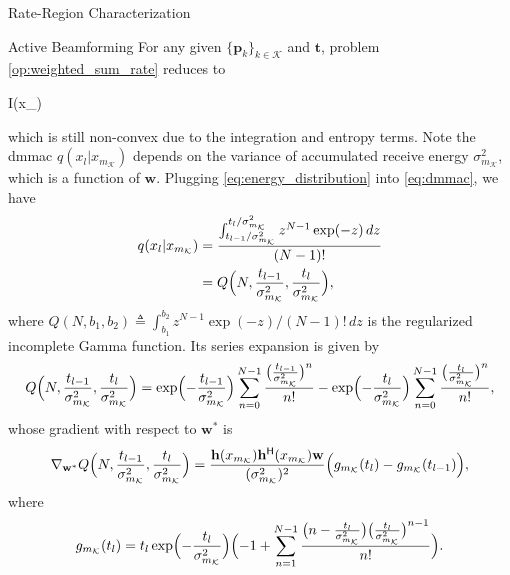 \begin{section}{Rate-Region Characterization}
	\begin{subsection}{Active Beamforming}
		For any given $\{\mathbf{p}_k\}_{k \in \mathcal{K}}$ and $\mathbf{t}$, problem \eqref{op:weighted_sum_rate} reduces to
		\begin{maxi!}
			{}{I(x_{})}{\label{op:active_beamforming}}{\label{ob:active_beamforming}}
			\addConstraint{\eqref{co:transmit_power},}
		\end{maxi!}
		which is still non-convex due to the integration and entropy terms.
		Note the \gls{dmmac} $q(x_l|x_{m_{\mathcal{K}}})$ depends on the variance of accumulated receive energy $\sigma_{m_{\mathcal{K}}}^2$, which is a function of $\mathbf{w}$.
		Plugging \eqref{eq:energy_distribution} into \eqref{eq:dmmac}, we have
		\begin{align}
			q(x_l|x_{m_{\mathcal{K}}})
			 & = \frac{\int_{{t_{l-1}}/{\sigma_{m_{\mathcal{K}}}^2}}^{{t_l}/{\sigma_{m_{\mathcal{K}}}^2}} z^{N-1} \exp(-z) \, d z}{(N-1)!} \\
			 & = Q\Bigl(N,\frac{t_{l-1}}{\sigma_{m_{\mathcal{K}}}^2},\frac{t_l}{\sigma_{m_{\mathcal{K}}}^2}\Bigr),
			\label{eq:dmmac_gamma}
		\end{align}
		where $Q(N, b_1, b_2) \triangleq \int_{b_1}^{b_2} z^{N-1} \exp(-z) / (N - 1)! \, d z$ is the regularized incomplete Gamma function.
		Its series expansion is given by \cite[Theorem 3]{Jameson2016}
		\begin{equation}
			Q\Bigl(N,\frac{t_{l-1}}{\sigma_{m_{\mathcal{K}}}^2},\frac{t_l}{\sigma_{m_{\mathcal{K}}}^2}\Bigr) = \exp \Bigl(-\frac{t_{l-1}}{\sigma_{m_{\mathcal{K}}}^2}\Bigr) \sum_{n=0}^{N-1} \frac{\bigl(\frac{t_{l-1}}{\sigma_{m_{\mathcal{K}}}^2}\bigr)^n}{n!} - \exp \Bigl(-\frac{t_l}{\sigma_{m_{\mathcal{K}}}^2}\Bigr) \sum_{n=0}^{N-1} \frac{\bigl(\frac{t_l}{\sigma_{m_{\mathcal{K}}}^2}\bigr)^n}{n!},
			\label{eq:regularized_incomplete_gamma}
		\end{equation}
		whose gradient with respect to $\mathbf{w}^*$ is
		\begin{equation}
			\nabla_{\mathbf{w}^*} Q\Bigl(N,\frac{t_{l-1}}{\sigma_{m_{\mathcal{K}}}^2},\frac{t_l}{\sigma_{m_{\mathcal{K}}}^2}\Bigr) = \frac{\mathbf{h}(x_{m_{\mathcal{K}}})\mathbf{h}^\mathsf{H}(x_{m_{\mathcal{K}}})\mathbf{w}}{(\sigma_{m_{\mathcal{K}}}^2)^2} \Bigl(g_{m_{\mathcal{K}}}(t_l) - g_{m_{\mathcal{K}}}(t_{l-1})\Bigr),
			\label{eq:regularized_incomplete_gamma_gradient}
		\end{equation}
		where
		\begin{equation}
			g_{m_{\mathcal{K}}}(t_l) = t_l\exp\Bigl(-\frac{t_l}{\sigma_{m_{\mathcal{K}}}^2}\Bigr)\Bigl(-1+\sum_{n=1}^{N-1} \frac{\bigl(n - \frac{t_l}{\sigma_{m_{\mathcal{K}}}^2}\bigr) \bigl(\frac{t_l}{\sigma_{m_{\mathcal{K}}}^2}\bigr)^{n-1}}{n!}\Bigr).

\end{equation}
\end{subsection}
\end{section}
